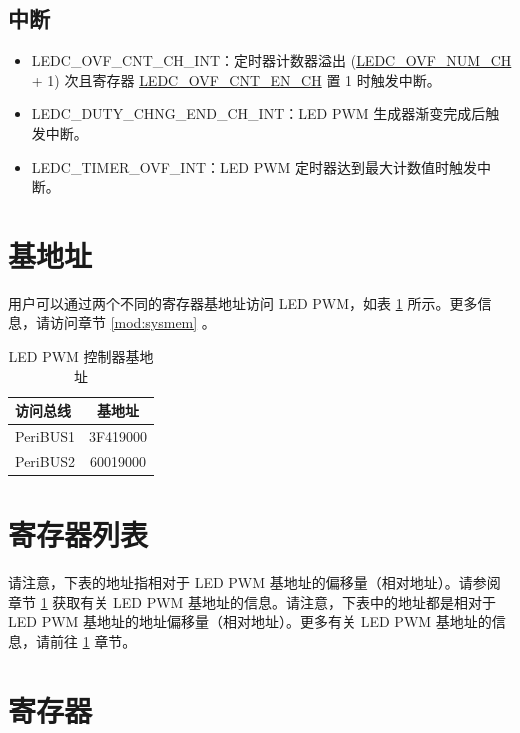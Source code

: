 \documentclass[main\_\_CN.tex]{subfiles}
\begin{document}
\subsection{中断}
\begin{itemize}
\item \label{int:LEDCOVFCNTCHnINT}LEDC\_OVF\_CNT\_CH\_INT：定时器计数器溢出 (\hyperref[fielddesc:LEDCOVFNUMCHN]{LEDC\_OVF\_NUM\_CH} + 1) 次且寄存器 \hyperref[fielddesc:LEDCOVFCNTENCHN]{LEDC\_OVF\_CNT\_EN\_CH} 置 1 时触发中断。
\item \label{int:LEDCDUTYCHNGENDCHnINT}LEDC\_DUTY\_CHNG\_END\_CH\_INT：LED PWM 生成器渐变完成后触发中断。
\item \label{int:LEDCTIMERxOVFINT}LEDC\_TIMER\_OVF\_INT：LED PWM 定时器达到最大计数值时触发中断。
\end{itemize}

\section{基地址}\label{subsection:ledc base address}
用户可以通过两个不同的寄存器基地址访问 LED PWM，如表 \ref{table:ledc base address} 所示。更多信息，请访问章节 \ref{mod:sysmem} \textit{}。

\begin{longtable}[c]{ | l |c| }
    \caption{LED PWM 控制器基地址} \label{table:ledc base address}
    \\\hline
    \rowcolor{lightgray}
    访问总线  &  基地址\\
    \hline
    PeriBUS1 & \hexprefix{}3F419000 \\\hline
    PeriBUS2 & \hexprefix{}60019000 \\\hline
\end{longtable}

\hypertarget{ledpwm-reg-summ}{}
\section{寄存器列表}

请注意，下表的地址指相对于 LED PWM 基地址的偏移量（相对地址）。请参阅章节 \ref{subsection:ledc base address} 获取有关 LED PWM 基地址的信息。请注意，下表中的地址都是相对于 LED PWM 基地址的地址偏移量（相对地址）。更多有关 LED PWM 基地址的信息，请前往 \ref{subsection:ledc base address} 章节。


\section{寄存器}

\end{document}
